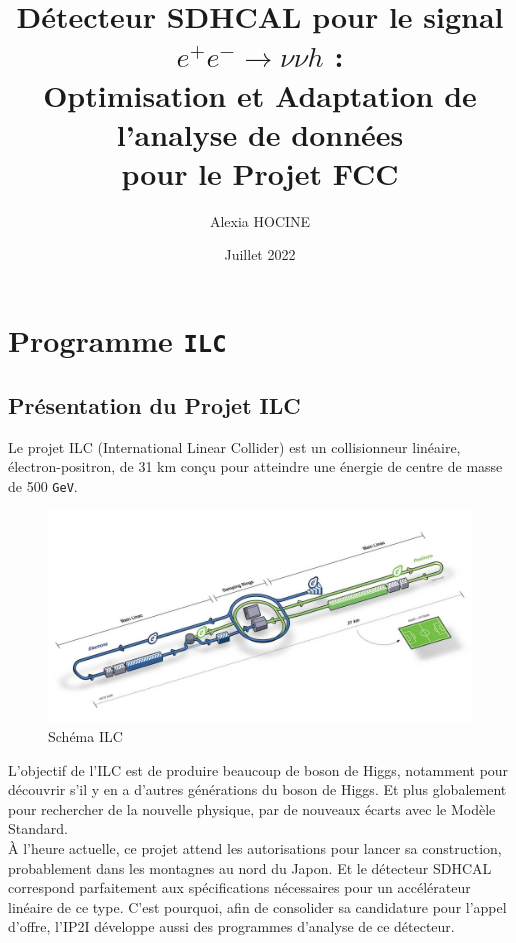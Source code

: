 \documentclass[10pt,a4paper]{report}
\author{Alexia \textsc{HOCINE}}
\title{Détecteur SDHCAL pour le signal  $ e^{+} e^{-} \longrightarrow \nu \nu h $ :\\Optimisation et Adaptation de l'analyse de données\\pour le Projet FCC 
}
\date{Juillet 2022}
\newcommand{\MS}{Modèle Standard\xspace}
\newcommand{\GeV}{\texttt{GeV}}
\begin{document}






\tableofcontents




\chapter{Programme \texttt{ILC}}

\section{Présentation du Projet ILC}

Le projet ILC (International Linear Collider) est un collisionneur linéaire, électron-positron, de 31 km conçu pour atteindre une énergie de centre de masse de 500 \GeV \cite{cern:ilc}. \\

\begin{figure}[h!]
	\center
	\includegraphics[width=\textwidth]{../img/ilc.jpg} 
	\caption{Schéma ILC\cite{cern:ilc}}
	\label{ilc:schema}
\end{figure}

L'objectif de l'ILC est de produire beaucoup de boson de Higgs, notamment pour découvrir s'il y en a d'autres générations du boson de Higgs. Et plus globalement pour rechercher de la nouvelle physique, par de nouveaux écarts avec le \MS.\\

À l'heure actuelle, ce projet attend les autorisations pour lancer sa construction, probablement dans les montagnes au nord du Japon. 
Et le détecteur SDHCAL correspond parfaitement aux spécifications nécessaires pour un accélérateur linéaire de ce type.
C'est pourquoi, afin de consolider sa candidature pour l'appel d'offre, l'IP2I développe aussi des programmes d'analyse de ce détecteur.
\end{document}
